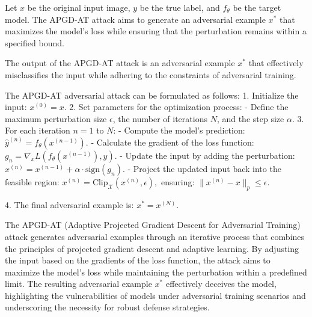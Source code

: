 Let \( x \) be the original input image, \( y \) be the true label, and \( f_{\theta} \) be the target model. The APGD-AT attack aims to generate an adversarial example \( x^* \) that maximizes the model's loss while ensuring that the perturbation remains within a specified bound.

The output of the APGD-AT attack is an adversarial example \( x^* \) that effectively misclassifies the input while adhering to the constraints of adversarial training.

The APGD-AT adversarial attack can be formulated as follows:
1. Initialize the input:
   $
   x^{(0)} = x.
   $
2. Set parameters for the optimization process:
   - Define the maximum perturbation size \( \epsilon \), the number of iterations \( N \), and the step size \( \alpha \).
3. For each iteration \( n = 1 \) to \( N \):
   - Compute the model's prediction:
   $
   \hat{y}^{(n)} = f_{\theta}(x^{(n-1)}).
   $
   - Calculate the gradient of the loss function:
   $
   g_n = \nabla_x L(f_{\theta}(x^{(n-1)}), y).
   $
   - Update the input by adding the perturbation:
   $
   x^{(n)} = x^{(n-1)} + \alpha \cdot \text{sign}(g_n).
   $
   - Project the updated input back into the feasible region:
   $
   x^{(n)} = \text{Clip}_{\mathcal{X}}(x^{(n)}, \epsilon),
   $
   ensuring:
   $
   \|x^{(n)} - x\|_p \leq \epsilon.
   $

4. The final adversarial example is:
   $
   x^* = x^{(N)}.
   $

The APGD-AT (Adaptive Projected Gradient Descent for Adversarial Training) attack generates adversarial examples through an iterative process that combines the principles of projected gradient descent and adaptive learning. By adjusting the input based on the gradients of the loss function, the attack aims to maximize the model's loss while maintaining the perturbation within a predefined limit. The resulting adversarial example \( x^* \) effectively deceives the model, highlighting the vulnerabilities of models under adversarial training scenarios and underscoring the necessity for robust defense strategies.
